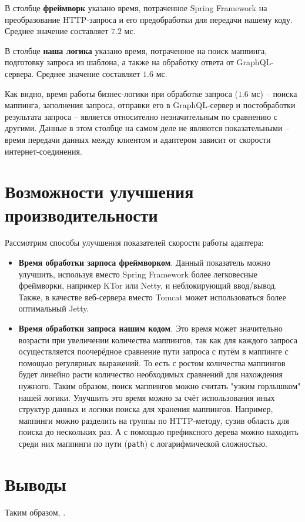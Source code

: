 В столбце \textbf{фреймворк} указано время, потраченное Spring Framework на преобразование HTTP-запроса и его предобработки для передачи нашему коду.
Среднее значение составляет $7.2$ мс.

В столбце \textbf{наша логика} указано время, потраченное на поиск маппинга, подготовку запроса из шаблона, а также на обработку ответа от GraphQL-сервера.
Среднее значение составляет $1.6$ мс.

Как видно, время работы бизнес-логики при обработке запроса ($1.6$ мс) -- поиска маппинга, заполнения запроса, отправки его в GraphQL-сервер и постобработки результата запроса -- является относително незначительным по сравнению с другими.
Данные в этом столбце на самом деле не являются показательными -- время передачи данных между клиентом и адаптером зависит от скорости интернет-соединения.


\section{Возможности улучшения производительности} \label{sec:ch4-performance-improve}

Рассмотрим способы улучшения показателей скорости работы адаптера:

\begin{itemize}
	\item \textbf{Время обработки зарпоса фреймворком}.
		Данный показатель можно улучшить, используя вместо Spring Framework более легковесные фреймворки, например KTor или Netty, и неблокирующий ввод/вывод.
		Также, в качестве веб-сервера вместо Tomcat может использоваться более оптимальный Jetty.

	\item \textbf{Время обработки запроса нашим кодом}.
		Это время может значительно возрасти при увеличении количества маппингов, так как для каждого запроса осуществляется поочерёдное сравнение пути запроса с путём в маппинге с помощью регулярных выражений.
То есть с ростом количества маппингов будет линейно расти количество необходимых сравнений для нахождения нужного.
Таким образом, поиск маппингов можно считать "узким горлышком" нашей логики.
Улучшить это время можно за счёт использования иных структур данных и логики поиска для хранения маппингов.
Например, маппинги можно разделить на группы по HTTP-методу, сузив область для поиска до нескольких раз.
А с помощью префиксного дерева можно находить среди них маппинги по пути (\texttt{path}) с логарифмической сложностью.
\end{itemize}

\section{Выводы} \label{ch4:conclusion}

Таким образом, .
